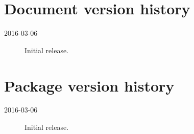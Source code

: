 \documentclass[
article,
11pt, %
a4paper, %
oneside, %
headinclude,footinclude, %
]{scrartcl}
\theoremstyle{definition} %
\theoremstyle{plain} %
\theoremstyle{remark} %
\newcommand{\address}[1]{\addvspace{\baselineskip}\noindent\emph{#1}}
\newcommand{\email}[1]{\href{mailto:#1}{\normalfont\texttt{#1}}}
\begin{document}
\section{Document version history}

\begin{description}
\item[2016-03-06] Initial release.
\end{description}

\section{Package version history}

\begin{description}
\item[2016-03-06] Initial release.
\end{description}

\renewcommand{\refname}{References} %



\nocite{*}

%
\end{document}
